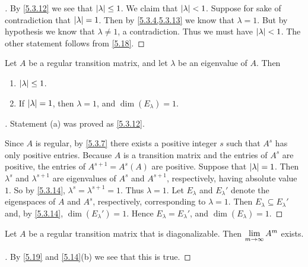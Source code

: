 \begin{proof}[]
  By \cref{5.3.12} we see that \(\left\lvert\lambda\right\rvert \leq 1\).
  We claim that \(\left\lvert\lambda\right\rvert < 1\).
  Suppose for sake of contradiction that \(\left\lvert\lambda\right\rvert = 1\).
  Then by \cref{5.3.4,5.3.13} we know that \(\lambda = 1\).
  But by hypothesis we know that \(\lambda \neq 1\), a contradiction.
  Thus we must have \(\left\lvert\lambda\right\rvert < 1\).
  The other statement follows from \cref{5.18}.
\end{proof}

\begin{thm}\label{5.19}
  Let \(A\) be a regular transition matrix, and let \(\lambda\) be an eigenvalue of \(A\).
  Then
  \begin{enumerate}
    \item \(\left\lvert\lambda\right\rvert \leq 1\).
    \item If \(\left\lvert\lambda\right\rvert = 1\), then \(\lambda = 1\), and \(\dim(E_{\lambda}) = 1\).
  \end{enumerate}
\end{thm}

\begin{proof}[]
  Statement (a) was proved as \cref{5.3.12}.

  Since \(A\) is regular, by \cref{5.3.7} there exists a positive integer \(s\) such that \(A^s\) has only positive entries.
  Because \(A\) is a transition matrix and the entries of \(A^s\) are positive, the entries of \(A^{s + 1} = A^s (A)\) are positive.
  Suppose that \(\left\lvert\lambda\right\rvert = 1\).
  Then \(\lambda^s\) and \(\lambda^{s + 1}\) are eigenvalues of \(A^s\) and \(A^{s + 1}\), respectively, having absolute value \(1\).
  So by \cref{5.3.14}, \(\lambda^s = \lambda^{s + 1} = 1\).
  Thus \(\lambda = 1\).
  Let \(E_{\lambda}\) and \(E_{\lambda}'\) denote the eigenspaces of \(A\) and \(A^s\), respectively, corresponding to \(\lambda = 1\).
  Then \(E_{\lambda} \subseteq E_{\lambda}'\) and, by \cref{5.3.14}, \(\dim(E_{\lambda}') = 1\).
  Hence \(E_{\lambda} = E_{\lambda}'\), and \(\dim(E_{\lambda}) = 1\).
\end{proof}

\begin{cor}\label{5.3.15}
  Let \(A\) be a regular transition matrix that is diagonalizable.
  Then \(\lim\limits_{m \to \infty} A^m\) exists.
\end{cor}

\begin{proof}[]
  By \cref{5.19} and \cref{5.14}(b) we see that this is true.
\end{proof}

